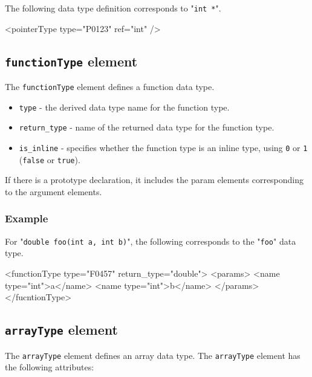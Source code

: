 The following data type definition corresponds to "{\tt int *}".
\vspace{2mm}

\begin{XcodeMLExample}
  <pointerType type="P0123" ref="int" />
\end{XcodeMLExample}


\subsection{ {\tt functionType} element}

The {\tt functionType} element defines a function data type.

\begin{itemize}
\item {\tt type} - the derived data type name for the function type.
\item {\tt return\_type} - name of the returned data type for the function type.
\item {\tt is\_inline} - specifies whether the function type is an inline type, using {\tt 0} or {\tt 1} ({\tt false} or {\tt true}).
\end{itemize}

If there is a prototype declaration, it includes the param elements corresponding to the argument elements.

\subsubsection*{Example}

For "{\tt double foo(int a, int b)}", the following corresponds to the "{\tt foo}" data type.
\vspace{2mm}

\begin{XcodeMLExample}
  <functionType type="F0457" return_type="double">
  <params>
      <name type="int">a</name>
      <name type="int">b</name>
    </params>
  </fucntionType>
\end{XcodeMLExample}


\subsection{ {\tt arrayType} element}

The {\tt arrayType} element defines an array data type. The {\tt arrayType} element has the following attributes:


